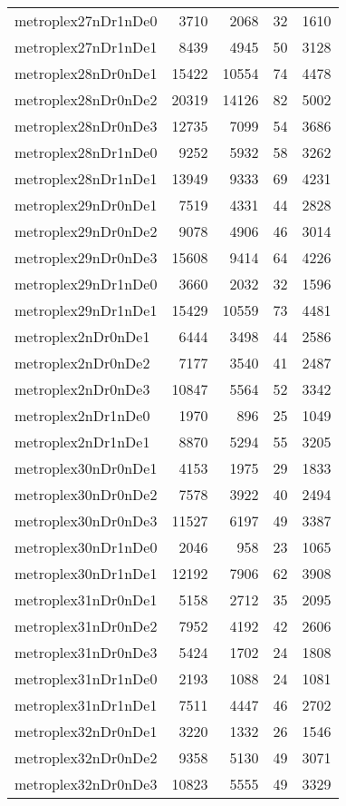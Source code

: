 \begin{tabular}{lrrrr}
metroplex27nDr1nDe0 & 3710 & 2068 & 32 & 1610 \\
metroplex27nDr1nDe1 & 8439 & 4945 & 50 & 3128 \\
metroplex28nDr0nDe1 & 15422 & 10554 & 74 & 4478 \\
metroplex28nDr0nDe2 & 20319 & 14126 & 82 & 5002 \\
metroplex28nDr0nDe3 & 12735 & 7099 & 54 & 3686 \\
metroplex28nDr1nDe0 & 9252 & 5932 & 58 & 3262 \\
metroplex28nDr1nDe1 & 13949 & 9333 & 69 & 4231 \\
metroplex29nDr0nDe1 & 7519 & 4331 & 44 & 2828 \\
metroplex29nDr0nDe2 & 9078 & 4906 & 46 & 3014 \\
metroplex29nDr0nDe3 & 15608 & 9414 & 64 & 4226 \\
metroplex29nDr1nDe0 & 3660 & 2032 & 32 & 1596 \\
metroplex29nDr1nDe1 & 15429 & 10559 & 73 & 4481 \\
metroplex2nDr0nDe1 & 6444 & 3498 & 44 & 2586 \\
metroplex2nDr0nDe2 & 7177 & 3540 & 41 & 2487 \\
metroplex2nDr0nDe3 & 10847 & 5564 & 52 & 3342 \\
metroplex2nDr1nDe0 & 1970 & 896 & 25 & 1049 \\
metroplex2nDr1nDe1 & 8870 & 5294 & 55 & 3205 \\
metroplex30nDr0nDe1 & 4153 & 1975 & 29 & 1833 \\
metroplex30nDr0nDe2 & 7578 & 3922 & 40 & 2494 \\
metroplex30nDr0nDe3 & 11527 & 6197 & 49 & 3387 \\
metroplex30nDr1nDe0 & 2046 & 958 & 23 & 1065 \\
metroplex30nDr1nDe1 & 12192 & 7906 & 62 & 3908 \\
metroplex31nDr0nDe1 & 5158 & 2712 & 35 & 2095 \\
metroplex31nDr0nDe2 & 7952 & 4192 & 42 & 2606 \\
metroplex31nDr0nDe3 & 5424 & 1702 & 24 & 1808 \\
metroplex31nDr1nDe0 & 2193 & 1088 & 24 & 1081 \\
metroplex31nDr1nDe1 & 7511 & 4447 & 46 & 2702 \\
metroplex32nDr0nDe1 & 3220 & 1332 & 26 & 1546 \\
metroplex32nDr0nDe2 & 9358 & 5130 & 49 & 3071 \\
metroplex32nDr0nDe3 & 10823 & 5555 & 49 & 3329 \\

\end{tabular}
